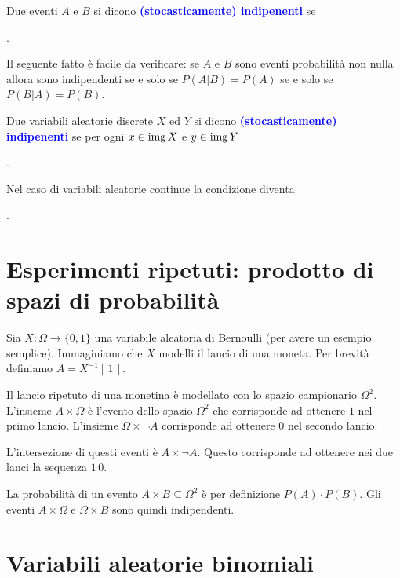 \documentclass[12pt,openany]{book}
\def\range{\mathop{\rm img}}
\def\emph#1{\textcolor{blue}{\textbf{\boldmath #1}}}
\theoremstyle{mio}
\theoremstyle{liscio}
\begin{document}
Due eventi $A$ e $B$ si dicono \emph{(stocasticamente) indipenenti\/} se 

. 

Il seguente fatto è facile da verificare: se $A$ e $B$ sono eventi probabilità non nulla allora sono indipendenti se e solo se $P(A|B)=P(A)$ se e solo se $P(B|A)=P(B)$.

Due variabili aleatorie discrete $X$ ed $Y$ si dicono \emph{(stocasticamente) indipenenti\/} se per ogni $x\in\range X$ e $y\in\range Y$

.

Nel caso di variabili aleatorie continue la condizione diventa


.



\clearpage\section{Esperimenti ripetuti: prodotto di spazi di probabilità}

Sia $X:\Omega\to\{0,1\}$ una variabile aleatoria di Bernoulli (per avere un esempio semplice). Immaginiamo che $X$ modelli il lancio di una moneta. Per brevità definiamo $A=X^{-1}[\,1\,]$.

Il lancio ripetuto di una monetina è modellato con lo spazio campionario $\Omega^2$. L'insieme  $A\times\Omega$ è l'evento dello spazio $\Omega^2$ che corrisponde  ad ottenere $1$ nel primo lancio. L'insieme $\Omega\times\!\neg A$ corrisponde ad ottenere $0$ nel secondo lancio.

L'intersezione di questi eventi è $A\times\!\neg A$. Questo corrisponde ad ottenere nei due lanci la sequenza $1\,0$. 

La probabilità di un evento $A\times B\subseteq\Omega^2$ è per definizione $P(A)\cdot P(B)$. Gli eventi $A\times\Omega$ e $\Omega\times B$ sono quindi indipendenti.




\clearpage\section{Variabili aleatorie binomiali}
\end{document}
